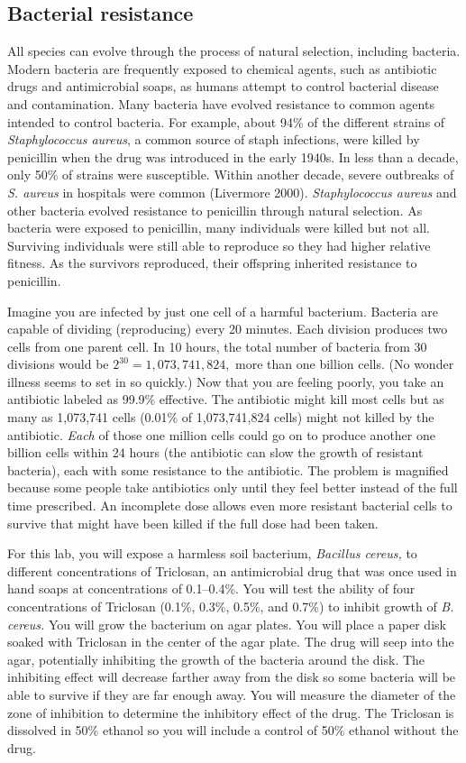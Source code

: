 \documentclass[12pt]{exam}
\begin{document}
\subsection*{Bacterial resistance}

All species can evolve through the process of natural selection, including bacteria. Modern bacteria are frequently exposed to chemical agents, such as antibiotic drugs and antimicrobial soaps, as humans attempt to control bacterial disease and contamination. Many bacteria have evolved resistance to common agents intended to control bacteria. For example, about 94\% of the different strains of \textit{Staphylococcus aureus}, a common source of staph infections, were killed by penicillin when the drug was introduced in the early 1940s. In less than a decade, only 50\% of strains were susceptible. Within another decade, severe outbreaks of \textit{S. aureus} in hospitals were common (Livermore 2000). \textit{Staphylococcus aureus} and other bacteria evolved resistance to penicillin through natural selection. As bacteria were exposed to penicillin, many individuals were killed but not all. Surviving individuals were still able to reproduce so they had higher relative fitness. As the survivors reproduced, their offspring inherited resistance to penicillin. 

Imagine you are infected by just one cell of a harmful bacterium. Bacteria are capable of dividing (reproducing) every 20 minutes. Each division produces two cells from one parent cell. In 10 hours, the total number of bacteria from 30 divisions would be $2^{30} = 1,073,741,824,$ more than one billion cells. (No wonder illness seems to set in so quickly.) Now that you are feeling poorly, you take an antibiotic labeled as 99.9\% effective. The antibiotic might kill most cells but as many as 1,073,741 cells (0.01\% of 1,073,741,824 cells) might not killed by the antibiotic. \emph{Each} of those one million cells could go on to produce another one billion cells within 24 hours (the antibiotic can slow the growth of resistant bacteria), each with some resistance to the antibiotic. The problem is magnified because some people take antibiotics only until they feel better instead of the full time prescribed. An incomplete dose allows even more resistant bacterial cells to survive that might have been killed if the full dose had been taken. 

For this lab, you will expose a harmless soil bacterium, \textit{Bacillus cereus,} to different concentrations of Triclosan, an antimicrobial drug that was once used in hand soaps at concentrations of 0.1–0.4\%. You will test the ability of four concentrations of Triclosan (0.1\%, 0.3\%, 0.5\%, and 0.7\%) to inhibit growth of \textit{B. cereus.} You will grow the bacterium on agar plates. You will place a paper disk soaked with Triclosan in the center of the agar plate. The drug will seep into the agar, potentially inhibiting the growth of the bacteria around the disk. The inhibiting effect will decrease farther away from the disk so some bacteria will be able to survive if they are far enough away. You will measure the diameter of the zone of inhibition to determine the inhibitory effect of the drug. The Triclosan is dissolved in 50\% ethanol so you will include a control of 50\% ethanol without the drug.
\end{document}
